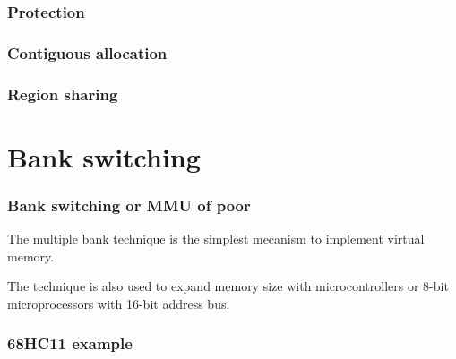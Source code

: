 \begin{frame}
  \frametitle{Protection}

  \begin{center}
  \end{center}

\end{frame}


\begin{frame}
  \frametitle{Contiguous allocation}

  \begin{center}
  \end{center}

\end{frame}


\begin{frame}
  \frametitle{Region sharing}

  \begin{center}
  \end{center}

\end{frame}

%
%

\section{Bank switching}


\begin{frame}
  \frametitle{Bank switching or MMU of poor}

  The multiple bank technique is the simplest mecanism to implement
  virtual memory.

  \-

  The technique is also used to expand memory size with
  microcontrollers or 8-bit microprocessors with 16-bit address bus.

\end{frame}


\begin{frame}
  \frametitle{68HC11 example}

  \begin{center}
  \end{center}

\end{frame}

